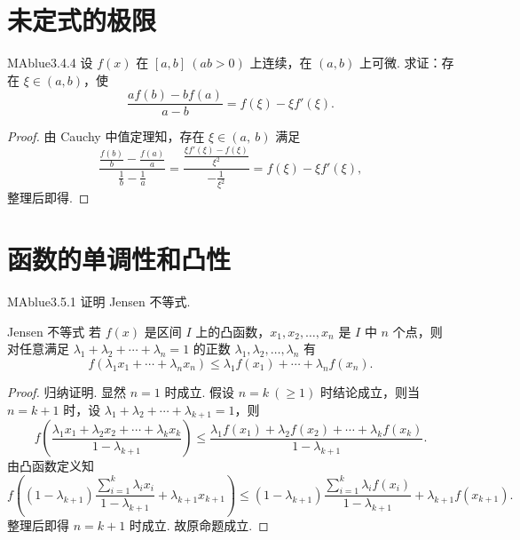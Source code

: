 \section{未定式的极限}

\begin{problem}{MAblue}{3.4.4}
    设 $f(x)$ 在 $[a, b] \ (ab>0)$ 上连续，在 $(a, b)$ 上可微. 求证：存在 $\xi \in (a, b)$，使
    \[
        \frac{af(b) - bf(a)}{a-b} = f(\xi) - \xi f'(\xi).
    \]
\end{problem}

\begin{proof}
    由 Cauchy 中值定理知，存在 $\xi \in (a,\ b)$ 满足
    \[
        \frac{\frac {f(b)} b - \frac {f(a)} a}{\frac 1 b - \frac 1 a} = \frac{\frac{\xi f'(\xi) - f(\xi)}{\xi^2}}{-\frac 1 {\xi^2}} = f(\xi) - \xi f'(\xi),
    \]
    整理后即得.
\end{proof}

\section{函数的单调性和凸性}

\begin{problem}{MAblue}{3.5.1}
    证明 Jensen 不等式.
\end{problem}

\begin{center}
    \begin{minipage}{0.9\textwidth}
        \begin{theorem}{Jensen 不等式}{}
            若 $f(x)$ 是区间 $I$ 上的凸函数，$x_1, x_2, \ldots, x_n$ 是 $I$ 中 $n$ 个点，则对任意满足 $\lambda_1 + \lambda_2 + \cdots + \lambda_n = 1$ 的正数 $\lambda_1, \lambda_2, \ldots, \lambda_n$ 有
            \[
                f(\lambda_1 x_1 + \cdots + \lambda_n x_n) \leqslant \lambda_1 f(x_1) + \cdots + \lambda_n f(x_n).
            \]
        \end{theorem}
    \end{minipage}
\end{center}

\begin{proof}
    归纳证明. 显然 $n = 1$ 时成立. 假设 $n=k \ (\geqslant 1)$ 时结论成立，则当 $n = k + 1$ 时，设 $\lambda_1 + \lambda_2 + \cdots + \lambda_{k+1} = 1$，则
    \[
        f(\frac{\lambda_1x_1 + \lambda_2x_2 + \cdots + \lambda_kx_k}{1-\lambda_{k+1}}) \leqslant \frac{\lambda_1f(x_1) + \lambda_2f(x_2) + \cdots + \lambda_kf(x_k)}{1-\lambda_{k+1}}.
    \]
    由凸函数定义知
    \[
        f\left( (1-\lambda_{k+1}) \frac{\sum_{i=1}^k \lambda_ix_i}{1-\lambda_{k+1}} + \lambda_{k+1}x_{k+1} \right) \leqslant (1-\lambda_{k+1}) \frac{\sum_{i=1}^k \lambda_if(x_i)}{1-\lambda_{k+1}} + \lambda_{k+1}f(x_{k+1}).
    \]
    {\flushleft 整理后即得 $n = k+1$ 时成立. 故原命题成立.}
\end{proof}


